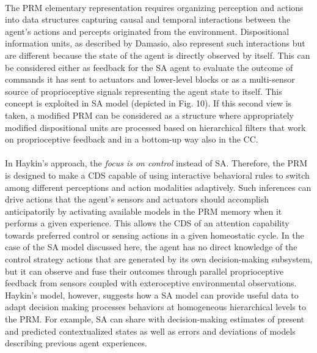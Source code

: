 \documentclass{article}
\begin{document}
		\paragraph{} The PRM elementary representation requires organizing
		perception and actions into data structures capturing causal
		and temporal interactions between the agent’s actions and
		percepts originated from the environment. Dispositional information units, as described by Damasio, also represent such
		interactions but are different because the state of the agent
		is directly observed by itself. This can be considered either
		as feedback for the SA agent to evaluate the outcome of
		commands it has sent to actuators and lower-level blocks or
		as a multi-sensor source of proprioceptive signals representing
		the agent state to itself. This concept is exploited in \cite{regazzoni-2020-multi-sensorial-generative-and-descriptive-self-awareness-models-for-autonomous-systems} SA
		model (depicted in Fig. 10). If this second view is taken,
		a modified PRM can be considered as a structure where
		appropriately modified dispositional units are processed based
		on hierarchical filters that work on proprioceptive feedback
		and in a bottom-up way also in the CC.
		\paragraph{} In Haykin’s approach, the \emph{focus is on control} instead of SA.
		Therefore, the PRM is designed to make a CDS capable of
		using interactive behavioral rules to switch among different
		perceptions and action modalities adaptively. Such inferences
		can drive actions that the agent’s sensors and actuators should
		accomplish anticipatorily by activating available models in
		the PRM memory when it performs a given experience. This
		allows the CDS of an attention capability towards preferred
		control or sensing actions in a given homeostatic cycle. In the
		case of the SA model discussed here, the agent has no direct
		knowledge of the control strategy actions that are generated
		by its own decision-making subsystem, but it can observe and
		fuse their outcomes through parallel proprioceptive feedback
		from sensors coupled with exteroceptive environmental observations. Haykin’s model, however, suggests how a SA model
		can provide useful data to adapt decision making processes
		behaviors at homogeneous hierarchical levels to the PRM.
		For example, SA can share with decision-making estimates
		of present and predicted contextualized states as well as
		errors and deviations of models describing previous agent
		experiences.
\end{document}

